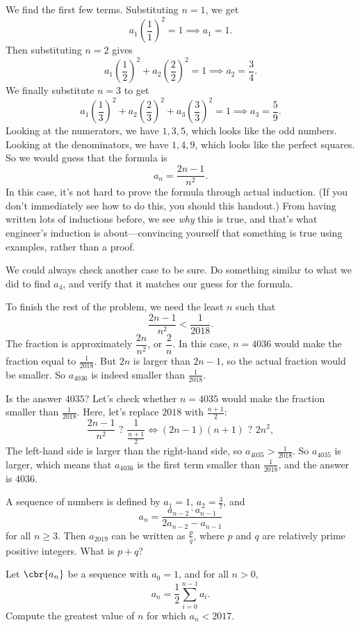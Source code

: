 \documentclass[11pt,paper=letter]{scrartcl}
\begin{document}
We find the first few terms. Substituting $n = 1$, we get
\[
  a_1\left(\frac{1}{1}\right)^2 = 1 \implies a_1 = 1.
\]
Then substituting $n = 2$ gives
\[
  a_1\left(\frac{1}{2}\right)^2 + a_2\left(\frac{2}{2}\right)^2 = 1 \implies a_2 = \frac{3}{4}.
\]
We finally substitute $n = 3$ to get
\[
  a_1\left(\frac{1}{3}\right)^2 + a_2\left(\frac{2}{3}\right)^2 + a_3\left(\frac{3}{3}\right)^2 = 1 \implies a_3 = \frac{5}{9}.
\]
Looking at the numerators, we have $1, 3, 5$, which looks like the odd numbers. Looking at the denominators, we have $1, 4, 9$, which looks like the perfect squares. So we would guess that the formula is
\[
  a_n = \frac{2n - 1}{n^2}.
\]
In this case, it's not hard to prove the formula through actual induction. (If you don't immediately see how to do this, you should  this handout.) From having written lots of inductions before, we see \emph{why} this is true, and that's what engineer's induction is about---convincing yourself that something is true using examples, rather than a proof.

\begin{exrboxed}
  We could always check another case to be sure. Do something similar to what we did to find $a_4$, and verify that it matches our guess for the formula.
\end{exrboxed}

To finish the rest of the problem, we need the least $n$ such that
\[
  \frac{2n-1}{n^2} < \frac{1}{2018}.
\]
The fraction is approximately $\dfrac{2n}{n^2}$, or $\dfrac{2}{n}$. In this case, $n = 4036$ would make the fraction equal to $\frac{1}{2018}$. But $2n$ is larger than $2n-1$, so the actual fraction would be smaller. So $a_{4036}$ is indeed smaller than $\frac{1}{2018}$.

Is the answer $4035$? Let's check whether $n = 4035$ would make the fraction smaller than $\frac{1}{2018}$. Here, let's  replace $2018$ with $\frac{n + 1}{2}$:
\[
  \frac{2n - 1}{n^2} \text{ ? } \frac{1}{\frac{n+1}{2}} \iff (2n-1)(n + 1) \text{ ? } 2n^2,
\]
The left-hand side is larger than the right-hand side, so $a_{4035} > \frac{1}{2018}$. So $a_{4035}$ is larger, which means that $a_{4036}$ is the first term smaller than $\frac{1}{2018}$, and the answer is $4036$.

\begin{mdframed}[style=exmdbox]
\begin{problem}[AMC 12A 2019/9]
A sequence of numbers is defined by $a_1 = 1$, $a_2 = \frac{3}{7}$, and $$a_n=\frac{a_{n-2} \cdot a_{n-1}}{2a_{n-2} - a_{n-1}}$$ for all $n \geq 3$. Then $a_{2019}$ can be written as $\frac{p}{q}$, where $p$ and $q$ are relatively prime positive integers. What is $p+q$?
\end{problem}

\begin{problem}
  Let $\cbr{a_n}$ be a sequence with $a_0 = 1$, and for all $n > 0$, \[a_n = \frac12 \sum_{i=0}^{n-1}a_i.\] Compute the greatest value of $n$ for which $a_n < 2017$. \hint{\ref{h:2}}
\end{problem}

\end{mdframed}
\end{document}
